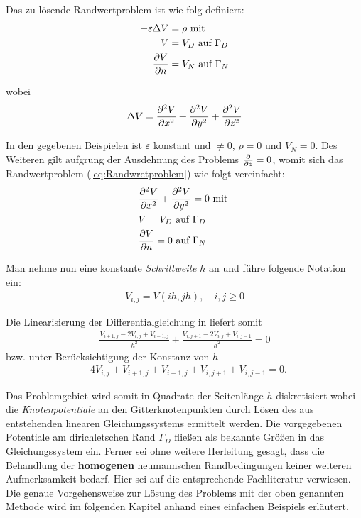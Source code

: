 
Das zu lösende Randwertproblem ist wie folg definiert:
\begin{align}
	\label{eq:Randwretproblem}
	-\varepsilon \Delta V &=  \rho  \text{ mit }\\
	V &= V_D \text{ auf } \Gamma_D \nonumber\\
	\frac{\partial V}{\partial n} &= V_N \text{ auf } \Gamma_N \nonumber
\end{align}

wobei \begin{align}
	\label{eq:LaplaceV}
	\Delta V = \frac{\partial^2 V}{\partial x^2} + \frac{\partial^2 V}{\partial y^2} + \frac{\partial^2 V}{\partial z^2}
\end{align}

In den gegebenen Beispielen ist $\varepsilon$ konstant und $\neq 0$, $\rho = 0$ und $V_N = 0$. Des Weiteren gilt aufgrung der Ausdehnung des Problems $\frac{\partial }{\partial z} = 0$, womit sich das Randwertproblem (\ref{eq:Randwretproblem}) wie folgt vereinfacht:
\begin{align}
	\label{eq:Randwertproblem_simple}
	&\frac{\partial^2 V}{\partial x^2} + \frac{\partial^2 V}{\partial y^2} = 0 \text{ mit }\\
	&V = V_D \text{ auf } \Gamma_D \nonumber\\
	&\frac{\partial V}{\partial n} = 0 \text{ auf } \Gamma_N \nonumber
\end{align}

Man nehme nun eine konstante \textit{Schrittweite} $h$ an und führe folgende Notation ein:
\begin{align*}
	V_{i,j} = V(ih,jh),\quad i,j\geq 0
\end{align*}

Die Linearisierung der Differentialgleichung in  liefert somit
\begin{align*}
	\frac{V_{i+1,j} - 2V_{i,j} + V_{i-1,j}}{h^2} + \frac{V_{i,j+1} - 2V_{i,j} + V_{i,j-1}}{h^2} = 0
\end{align*}
bzw. unter Berücksichtigung der Konstanz von $h$
\begin{align}
	\label{eq:lin_eq}
	-4V_{i,j} + V_{i+1,j} + V_{i-1,j} + V_{i,j+1} + V_{i,j-1} = 0.
\end{align}

Das Problemgebiet wird somit in Quadrate der Seitenlänge $h$ diskretisiert wobei die \textit{Knotenpotentiale} an den Gitterknotenpunkten durch Lösen des aus  entstehenden linearen Gleichungssystems ermittelt werden. Die vorgegebenen Potentiale am dirichletschen Rand $\Gamma_D$ fließen als bekannte Größen in das Gleichungssystem ein. \newline
Ferner sei ohne weitere Herleitung gesagt, dass die Behandlung der \textbf{homogenen} neumannschen Randbedingungen keiner weiteren Aufmerksamkeit bedarf. Hier sei auf die entsprechende Fachliteratur verwiesen. \newline
Die genaue Vorgehensweise zur Lösung des Problems mit der oben genannten Methode wird im folgenden Kapitel anhand eines einfachen Beispiels erläutert.

